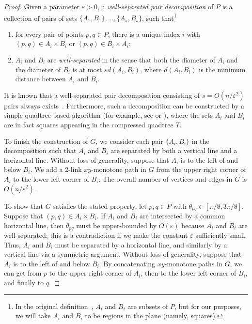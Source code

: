 \documentclass[11pt]{article}
\begin{document}
\begin{proof}
Given a parameter $\varepsilon>0$,
a {\em well-separated pair decomposition\/} of $P$ is
a collection of pairs of sets $\{A_1,B_1\},\ldots,\{A_s,B_s\}$,
such that\footnote{
In the original definition~\cite{CalKos}, $A_i$ and $B_i$ are subsets of $P$,
but for our purposes, we will take $A_i$ and $B_i$ to be regions in the plane
(namely, squares).
}
\begin{enumerate}
\item for every pair of points $p,q\in P$, there is a unique index $i$
with $(p,q)\in A_i\times B_i$ or $(p,q)\in B_i\times A_i$;
\item $A_i$ and $B_i$ are {\em well-separated\/} in the sense that
both the diameter of $A_i$ and the diameter of $B_i$ is at most
$\varepsilon d(A_i,B_i)$, where $d(A_i,B_i)$ is the minimum distance between $A_i$ and $B_i$.
\end{enumerate}
It is known that a well-separated pair decomposition consisting
of $s=O(n/\varepsilon^2)$ pairs always exists~\cite{CalKos}.
Furthermore, such a decomposition
can be constructed by a simple quadtree-based algorithm (for example, see
\cite{Har-Peled:book} or \cite{Chan:wspd}), where the sets $A_i$ and $B_i$
are in fact squares appearing in the compressed quadtree $T$.

To finish the construction of $G$, we consider each pair $\{A_i,B_i\}$ in the
decomposition such that $A_i$ and $B_i$ are separated by both a vertical line
and a horizontal line.
Without loss of generality, suppose that $A_i$ is to the left of and below $B_i$.
We add a 2-link $xy$-monotone path in $G$ from the upper right
corner of $A_i$ to the lower left corner of $B_i$.
The overall number of vertices and edges in $G$ is $O(n/\varepsilon^2)$.

To show that $G$ satisfies the stated property, let $p,q\in P$
with $\theta_{pq}\in [\pi/8,3\pi/8]$.
Suppose that $(p,q)\in A_i\times B_i$.
If $A_i$ and $B_i$ are intersected by a common horizontal line, then
$\theta_{pq}$ must be upper-bounded by $O(\varepsilon)$ because $A_i$ and $B_i$
are well-separated; this is a contradiction
if we make the constant $\varepsilon$ sufficiently small.
Thus, $A_i$ and $B_i$ must be separated by a horizontal line, and similarly
by a vertical line via a symmetric argument.
Without loss of generality, suppose that $A_i$ is to the left of and below $B_i$.
By concatenating $xy$-monotone paths in $G$, we can get from $p$
to the upper right corner of $A_i$, then to the lower left corner of $B_i$,
and finally to $q$.
\end{proof}
\end{document}
